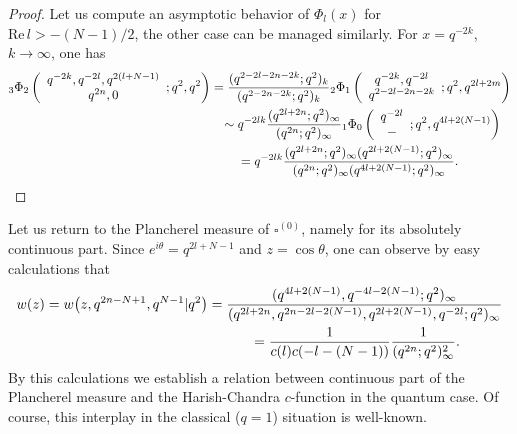 \documentclass[pdftex]{sigma}
\begin{document}
\begin{proof} Let us compute an asymptotic behavior of $\Phi_l(x)$ for $\mathrm{Re} \,l > -(N-1)/2$, the other
case can be managed similarly. For $x=q^{-2k}$, $k \rightarrow \infty$, one has
\begin{gather*}
{_{3}\Phi_{2}}\left( \begin{array}{c} q^{-2k},q^{-2l},q^{2(l+N-1)}\\
q^{2n},0
\end{array} ;q^2,q^2\right)= \frac{(q^{2-2l-2n-2k};q^2)_k}{(q^{2-2n-2k};q^2)_k} {_{2}\Phi_{1}}\left(
\begin{array}{c} q^{-2k},q^{-2l}\\ q^{2-2l-2n-2k}
\end{array} ;q^2,q^{2l+2m}\right)
\\
\hphantom{{_{3}\Phi_{2}}\left( \begin{array}{c} q^{-2k},q^{-2l},q^{2(l+N-1)}\\
q^{2n},0
\end{array} ;q^2,q^2\right)}{}
\sim q^{-2lk}
\frac{(q^{2l+2n};q^2)_\infty}{(q^{2n};q^2)_\infty} {_{1}\Phi_{0}}\left(
\begin{array}{c} q^{-2l}\\ - \end{array} ;q^2,q^{4l+2(N-1)}\right) \\
\hphantom{{_{3}\Phi_{2}}\left( \begin{array}{c} q^{-2k},q^{-2l},q^{2(l+N-1)}\\
q^{2n},0
\end{array} ;q^2,q^2\right)}{}
=q^{-2lk}
\frac{(q^{2l+2n};q^2)_\infty(q^{2l+2(N-1)};q^2)_{\infty}}{(q^{2n};q^2)_\infty(q^{4l+2(N-1)};q^2)_\infty}.
  \tag*{\qed}
\end{gather*}
\renewcommand{\qed}{}
\end{proof}

Let us return to the Plancherel measure of $\square^{(0)}$, namely for its absolutely continuous part. Since
$e^{i\theta}=q^{2l+N-1}$ and $z=\cos \theta$, one can observe by easy calculations that
\begin{gather*}
w(z)=w\big(z,q^{2n-N+1},q^{N-1}|q^2\big)=\frac{(q^{4l+2(N-1)},q^{-4l-2(N-1)};q^2)_\infty}{(q^{2l+2n},q^{2n-2l-2(N-1)},
q^{2l+2(N-1)},q^{-2l};q^2)_\infty}
\\
\hphantom{w(z)=w\big(z,q^{2n-N+1},q^{N-1}|q^2\big)}{}
=\frac{1}{c(l)c(-l-(N-1))}\frac{1}{(q^{2n};q^2)^2_\infty}.
\end{gather*}
By this calculations we establish a relation between continuous part of the Plancherel measure and the
Harish-Chandra $c$-function in the quantum case. Of course, this interplay in the classical ($q=1$) situation
is well-known.
\end{document}
